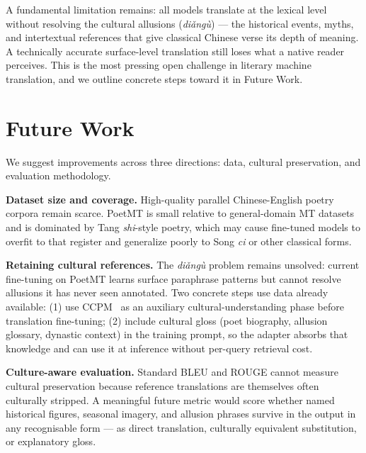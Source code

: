 A fundamental limitation remains: all models translate at the lexical level without resolving the cultural allusions (\textit{di\v{a}ng\`{u}}) --- the historical events, myths, and intertextual references that give classical Chinese verse its depth of meaning. A technically accurate surface-level translation still loses what a native reader perceives. This is the most pressing open challenge in literary machine translation, and we outline concrete steps toward it in Future Work.

\section{Future Work}
We suggest improvements across three directions: data, cultural preservation, and evaluation methodology.

\textbf{Dataset size and coverage.} High-quality parallel Chinese-English poetry corpora remain scarce. PoetMT is small relative to general-domain MT datasets and is dominated by Tang \emph{shi}-style poetry, which may cause fine-tuned models to overfit to that register and generalize poorly to Song \emph{ci} or other classical forms.

\textbf{Retaining cultural references.} The \textit{di\v{a}ng\`{u}} problem remains unsolved: current fine-tuning on PoetMT learns surface paraphrase patterns but cannot resolve allusions it has never seen annotated. Two concrete steps use data already available: (1) use CCPM~\cite{li2021ccpm} as an auxiliary cultural-understanding phase before translation fine-tuning; (2) include cultural gloss (poet biography, allusion glossary, dynastic context) in the training prompt, so the adapter absorbs that knowledge and can use it at inference without per-query retrieval cost.

\textbf{Culture-aware evaluation.} Standard BLEU and ROUGE cannot measure cultural preservation because reference translations are themselves often culturally stripped. A meaningful future metric would score whether named historical figures, seasonal imagery, and allusion phrases survive in the output in any recognisable form --- as direct translation, culturally equivalent substitution, or explanatory gloss.

